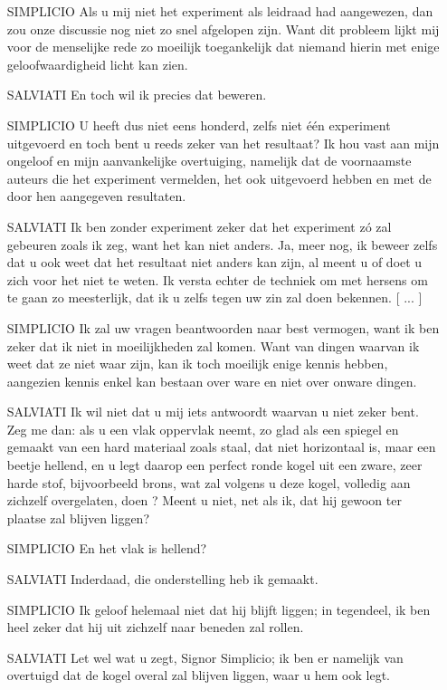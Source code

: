 {\begin{enumerate}
\item[SIMPLICIO]Als u mij niet het experiment als leidraad had aangewezen, dan zou onze discussie nog niet zo snel afgelopen zijn. Want dit probleem lijkt mij voor de menselijke rede zo moeilijk toegankelijk dat niemand hierin met enige geloofwaardigheid licht kan zien. 
\item[SALVIATI]En toch wil ik precies dat beweren.
\item[SIMPLICIO]U heeft dus niet eens honderd, zelfs niet \'e\'en experiment uitgevoerd en toch bent u reeds zeker van het resultaat? Ik hou vast aan mijn ongeloof en mijn aanvankelijke overtuiging, namelijk dat de voornaamste auteurs die het experiment vermelden, het ook uitgevoerd hebben en met de door hen aangegeven resultaten.
\item[SALVIATI]Ik ben zonder experiment zeker dat het experiment z\'o zal gebeuren zoals ik zeg, want het kan niet anders. Ja, meer nog, ik beweer zelfs dat u ook weet dat het resultaat niet anders kan zijn, al meent u of doet u zich voor het niet te weten. Ik versta echter de techniek om met hersens om te gaan zo meesterlijk, dat ik u zelfs tegen uw zin zal doen bekennen. [ ... ]
\item[SIMPLICIO]Ik zal uw vragen beantwoorden naar best vermogen, want ik ben zeker dat ik niet in moeilijkheden zal komen. Want van dingen waarvan ik weet dat ze niet waar zijn, kan ik toch moeilijk enige kennis hebben, aangezien kennis enkel kan bestaan over ware en niet over onware dingen.
\item[SALVIATI]Ik wil niet dat u mij iets antwoordt waarvan u niet zeker bent. Zeg me dan: als u een vlak oppervlak neemt, zo glad als een spiegel en gemaakt van een hard materiaal zoals staal, dat niet horizontaal is, maar een beetje hellend, en u legt daarop een perfect ronde kogel uit een zware, zeer harde stof, bijvoorbeeld brons, wat zal volgens u deze kogel, volledig aan zichzelf overgelaten, doen ? Meent u niet, net als ik, dat hij gewoon ter plaatse zal blijven liggen?
\item[SIMPLICIO]En het vlak is hellend?
\item[SALVIATI]Inderdaad, die onderstelling heb ik gemaakt. 
\item[SIMPLICIO]Ik geloof helemaal niet dat hij blijft liggen; in tegendeel, ik ben heel zeker dat hij uit zichzelf naar beneden zal rollen.
\item[SALVIATI]Let wel wat u zegt, Signor Simplicio; ik ben er namelijk van overtuigd dat de kogel overal zal blijven liggen, waar u hem ook legt.

\end{enumerate}}
